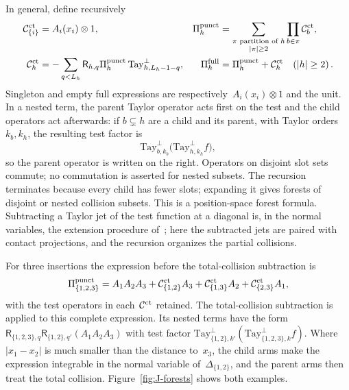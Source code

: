 In general, define recursively
\begin{align}\label{eq:J-contact-recursion}
\mathcal C_{\{i\}}^{\rm ct}&=A_i(x_i)\otimes1,&
\Pi_h^{\rm punct}&=\sum_{\substack{\pi\text{ partition of }h\\|\pi|\ge2}}
                         \prod_{b\in\pi}\mathcal C_b^{\rm ct},\\
\mathcal C_h^{\rm ct}&=-\sum_{q<L_h}\mathsf R_{h,q}\Pi_h^{\rm punct}\,
                         \mathrm{Tay}_{h,L_h-1-q}^{\perp},&
\Pi_h^{\rm full}&=\Pi_h^{\rm punct}+\mathcal C_h^{\rm ct}\quad(|h|\ge2)\,.\notag
\end{align}
Singleton and empty full expressions are respectively~$A_i(x_i)\otimes1$ and the unit. In a nested term, the parent Taylor operator acts first on the test and the child operators act afterwards: if $b\subsetneq h$ are a child and its parent, with Taylor orders $k_b,k_h$, the resulting test factor is
\begin{equation*}
\mathrm{Tay}_{b,k_b}^{\perp}\bigl(\mathrm{Tay}_{h,k_h}^{\perp}f\bigr),
\end{equation*}
so the parent operator is written on the right. Operators on disjoint slot sets commute; no commutation is asserted for nested subsets. The recursion terminates because every child has fewer slots; expanding it gives forests of disjoint or nested collision subsets. This is a position-space forest formula. Subtracting a Taylor jet of the test function at a diagonal is, in the normal variables, the extension procedure of~\cite[Section~5.2, Theorem~5.3]{BrunettiFredenhagen2000}; here the subtracted jets are paired with contact projections, and the recursion organizes the partial collisions.

For three insertions the expression before the total-collision subtraction is
\begin{equation*}
\Pi_{\{1,2,3\}}^{\rm punct}
=A_1A_2A_3+\mathcal C_{\{1,2\}}^{\rm ct}A_3
+\mathcal C_{\{1,3\}}^{\rm ct}A_2+\mathcal C_{\{2,3\}}^{\rm ct}A_1,
\end{equation*}
with the test operators in each~$\mathcal C^{\rm ct}$ retained. The total-collision subtraction is applied to this complete expression. Its nested terms have the form $\mathsf R_{\{1,2,3\},q}\mathsf R_{\{1,2\},q'}(A_1A_2A_3)$ with test factor $\mathrm{Tay}^\perp_{\{1,2\},k'}(\mathrm{Tay}^\perp_{\{1,2,3\},k}f)$. Where $|x_1-x_2|$ is much smaller than the distance to~$x_3$, the child arms make the expression integrable in the normal variable of~$\Delta_{\{1,2\}}$, and the parent arms then treat the total collision. Figure~\ref{fig:J-forests} shows both examples.

